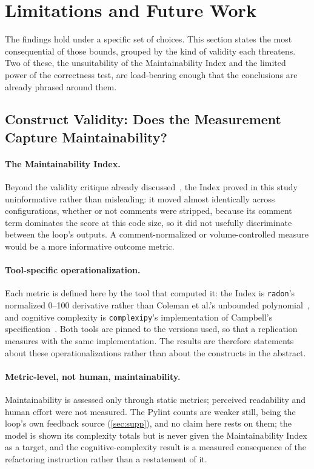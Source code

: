 
\section{Limitations and Future Work}
\label{sec:limitations}

The findings hold under a specific set of choices. This section states the most
consequential of those bounds, grouped by the kind of validity each threatens. Two of these, the unsuitability of the Maintainability
Index and the limited power of the correctness test, are load-bearing enough that the conclusions are already phrased
around them.

\subsection{Construct Validity: Does the Measurement Capture Maintainability?}

\paragraph{The Maintainability Index.} Beyond the validity critique already
discussed~\citep{heitlager2007maintainability}, the Index proved in this study
uninformative rather than misleading: it moved almost identically across
configurations, whether or not comments were stripped, because its comment term
dominates the score at this code size, so it did not usefully discriminate between
the loop's outputs. A comment-normalized or volume-controlled measure would be a more
informative outcome metric.

\paragraph{Tool-specific operationalization.} Each metric is defined here by the
tool that computed it: the Index is \texttt{radon}'s normalized 0--100 derivative
rather than Coleman et al.'s unbounded
polynomial~\citep{coleman1994maintainability,radon_docs}, and cognitive complexity
is \texttt{complexipy}'s implementation of Campbell's
specification~\citep{cognitivecomplexity,complexipy_tool}. Both tools are pinned to the
versions used, so that a replication measures with the same implementation. The
results are therefore statements about these operationalizations rather than about
the constructs in the abstract.

\paragraph{Metric-level, not human, maintainability.} Maintainability is assessed
only through static metrics; perceived readability and human effort were not
measured. The Pylint counts are weaker still, being the loop's own feedback source
(\cref{sec:supp}), and no claim here rests on them; the model is shown its complexity
totals but is never given the Maintainability Index as a target, and the
cognitive-complexity result is a measured consequence of the refactoring instruction
rather than a restatement of it.


